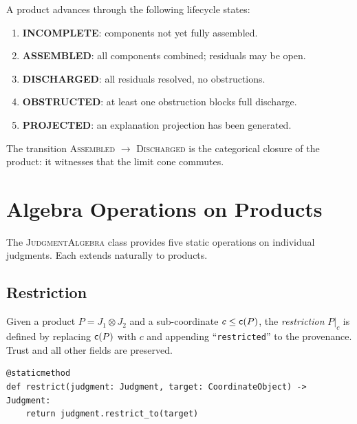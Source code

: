 \documentclass[11pt]{article}
\newcommand{\Jprod}{\mathbin{\otimes}}            %
\newcommand{\JprodN}[2]{#1 \Jprod #2}             %
\begin{document}
A product advances through the following lifecycle states:
\begin{enumerate}
  \item \textbf{INCOMPLETE}: components not yet fully assembled.
  \item \textbf{ASSEMBLED}: all components combined; residuals may be open.
  \item \textbf{DISCHARGED}: all residuals resolved, no obstructions.
  \item \textbf{OBSTRUCTED}: at least one obstruction blocks full discharge.
  \item \textbf{PROJECTED}: an explanation projection has been generated.
\end{enumerate}

The transition \textsc{Assembled} $\to$ \textsc{Discharged} is the
categorical closure of the product: it witnesses that the limit cone
commutes.

\section{Algebra Operations on Products}\label{sec:algebra}

The \textsc{JudgmentAlgebra} class provides five static operations on
individual judgments.  Each extends naturally to products.

\subsection{Restriction}

\begin{definition}\label{def:restrict}
Given a product $P = \JprodN{J_1}{J_2}$ and a sub-coordinate $c \leq
\mathsf{c}(P)$, the \emph{restriction} $P|_c$ is defined by replacing
$\mathsf{c}(P)$ with $c$ and appending ``\texttt{restricted}'' to the
provenance.  Trust and all other fields are preserved.
\end{definition}

\begin{lstlisting}[style=jugeo-python, caption={JudgmentAlgebra.restrict
  (from \texttt{judgment\_terms.py}).},
  label=lst:restrict]
@staticmethod
def restrict(judgment: Judgment, target: CoordinateObject) -> Judgment:
    return judgment.restrict_to(target)
\end{lstlisting}
\end{document}
